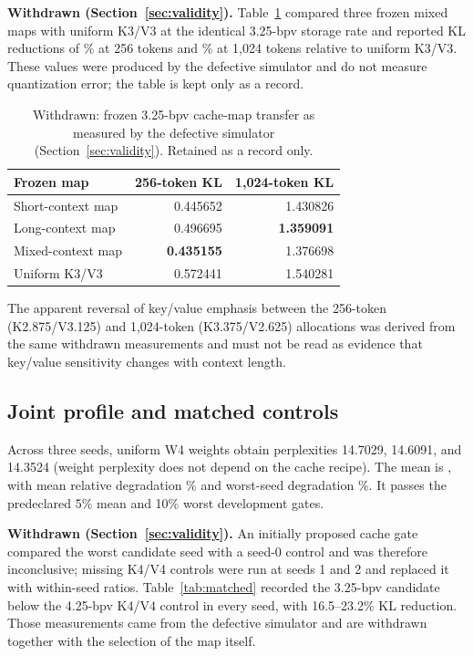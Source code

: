 \documentclass[10pt,twocolumn]{article}
\begin{document}
\textbf{Withdrawn (Section~\ref{sec:validity}).}
Table~\ref{tab:cache-transfer} compared three frozen mixed maps with uniform
K3/V3 at the identical 3.25-bpv storage rate and reported KL reductions of
\CacheShortReductionPct\% at 256 tokens and \CacheLongReductionPct\% at
1,024 tokens relative to uniform K3/V3. These values were produced by the
defective simulator and do not measure quantization error; the table is kept
only as a record.

\begin{table}[t]
\centering
\small
\caption{Withdrawn: frozen 3.25-bpv cache-map transfer as measured by the
defective simulator (Section~\ref{sec:validity}). Retained as a record only.}
\label{tab:cache-transfer}
\begin{tabular}{lrr}
\toprule
Frozen map & 256-token KL & 1,024-token KL \\
\midrule
Short-context map & 0.445652 & 1.430826 \\
Long-context map & 0.496695 & \textbf{1.359091} \\
Mixed-context map & \textbf{0.435155} & 1.376698 \\
Uniform K3/V3 & 0.572441 & 1.540281 \\
\bottomrule
\end{tabular}
\end{table}

The apparent reversal of key/value emphasis between the 256-token
(K2.875/V3.125) and 1,024-token (K3.375/V2.625) allocations was derived from
the same withdrawn measurements and must not be read as evidence that
key/value sensitivity changes with context length.

\subsection{Joint profile and matched controls}

Across three seeds, uniform W4 weights obtain perplexities 14.7029, 14.6091,
and 14.3524 (weight perplexity does not depend on the cache recipe). The mean
is \QwenJointMeanPPL{}, with mean relative degradation
\QwenJointMeanRelativePct\% and worst-seed degradation
\QwenJointWorstRelativePct\%. It passes the predeclared 5\% mean and 10\%
worst development gates.

\textbf{Withdrawn (Section~\ref{sec:validity}).} An initially proposed cache
gate compared the worst candidate seed with a seed-0 control and was therefore
inconclusive; missing K4/V4 controls were run at seeds 1 and 2 and replaced it
with within-seed ratios. Table~\ref{tab:matched} recorded the 3.25-bpv
candidate below the 4.25-bpv K4/V4 control in every seed, with 16.5--23.2\% KL
reduction. Those measurements came from the defective simulator and are
withdrawn together with the selection of the map itself.
\end{document}
